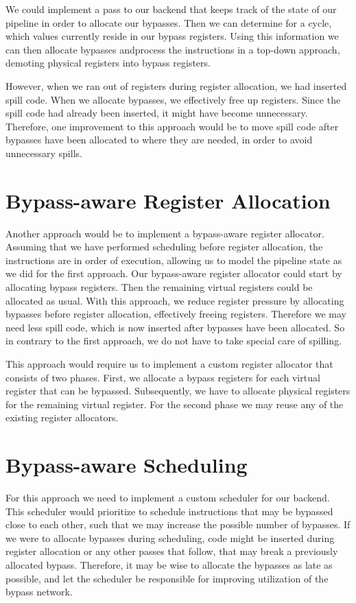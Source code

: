 We could implement a pass to our backend that keeps track of the state of our pipeline in order to allocate our bypasses. Then we can determine for a cycle, which values currently reside in our bypass registers. Using this information we can then allocate bypasses andprocess the instructions in a top-down approach, demoting physical registers into bypass registers.

However, when we ran out of registers during register allocation, we had inserted spill code. When we allocate bypasses, we effectively free up registers. Since the spill code had already been inserted, it might have become unnecessary. Therefore, one improvement to this approach would be to move spill code after bypasses have been allocated to where they are needed, in order to avoid unnecessary spills.

\section{Bypass-aware Register Allocation}\label{sec:ra_approach}
Another approach would be to implement a bypass-aware register allocator. Assuming that we have performed scheduling before register allocation, the instructions are in order of execution, allowing us to model the pipeline state as we did for the first approach. Our bypass-aware register allocator could start by allocating bypass registers. Then the remaining virtual registers could be allocated as usual. With this approach, we reduce register pressure by allocating bypasses before register allocation, effectively freeing registers. Therefore we may need less spill code, which is now inserted after bypasses have been allocated. So in contrary to the first approach, we do not have to take special care of spilling.

This approach would require us to implement a custom register allocator that consists of two phases. First, we allocate a bypass registers for each virtual register that can be bypassed. Subsequently, we have to allocate physical registers for the remaining virtual register. For the second phase we may reuse any of the existing register allocators. 

\section{Bypass-aware Scheduling}\label{sec:scheduling_approach}
For this approach we need to implement a custom scheduler for our backend. This scheduler would prioritize to schedule instructions that may be bypassed close to each other, such that we may increase the possible number of bypasses. If we were to allocate bypasses during scheduling, code might be inserted during register allocation or any other passes that follow, that may break a previously allocated bypass. Therefore, it may be wise to allocate the bypasses as late as possible, and let the scheduler be responsible for improving utilization of the bypass network. 


